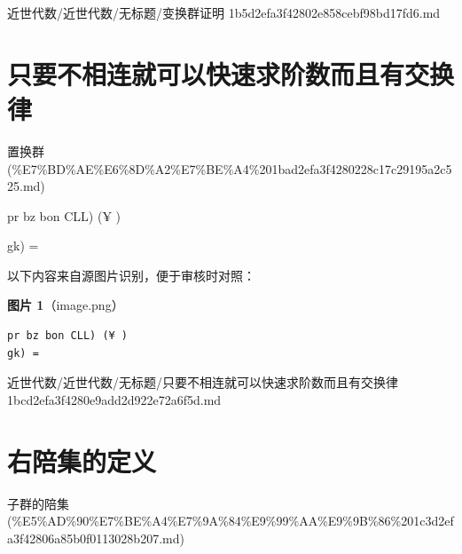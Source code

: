 \begin{note}[来源路径]

近世代数/近世代数/无标题/变换群证明 1b5d2efa3f42802e858cebf98bd17fd6.md

\end{note}

\section*{只要不相连就可以快速求阶数而且有交换律}

\begin{note}[来源上级主题]

置换群 (\%E7\%BD\%AE\%E6\%8D\%A2\%E7\%BE\%A4\%201bad2efa3f4280228c17c29195a2c525.md)

\end{note}

\begin{note}[只要不相连就可以快速求阶数而且有交换律]

pr bz bon CLL) (¥ )

gk) =

\end{note}

\begin{note}
以下内容来自源图片识别，便于审核时对照：

\textbf{图片 1}（image.png）
\begin{Verbatim}[fontsize=\small]
pr bz bon CLL) (¥ )
gk) =
\end{Verbatim}

\end{note}

\begin{note}[来源路径]

近世代数/近世代数/无标题/只要不相连就可以快速求阶数而且有交换律 1bcd2efa3f4280e9add2d922e72a6f5d.md

\end{note}

\section*{右陪集的定义}

\begin{note}[来源上级主题]

子群的陪集 (\%E5\%AD\%90\%E7\%BE\%A4\%E7\%9A\%84\%E9\%99\%AA\%E9\%9B\%86\%201c3d2efa3f42806a85b0f0113028b207.md)

\end{note}

